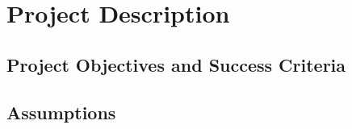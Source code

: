 \documentclass[12pt]{charter}
\begin{document}
\maketitle

\setcounter{page}{2}




\newpage
{}
\setcounter{page}{1}

\section*{Project Description}
\label{sec:description}

	\subsection*{Project Objectives and Success Criteria}
	\label{subsec:objandsuccess}
	
	\subsection*{Assumptions}
\end{document}
